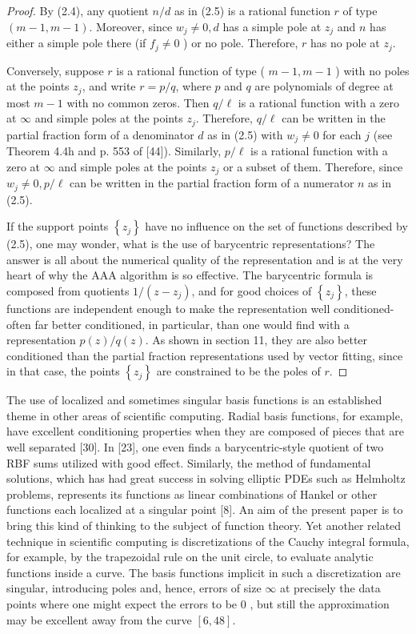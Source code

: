 \documentclass[11pt]{article}
\theoremstyle{definition}
\begin{document}
    
    \begin{proof}
        By (2.4), any quotient $n / d$ as in (2.5) is a rational function $r$ of type $(m-1, m-1)$. Moreover, since $w_{j} \neq 0, d$ has a simple pole at $z_{j}$ and $n$ has either a simple pole there (if $f_{j} \neq 0$ ) or no pole. Therefore, $r$ has no pole at $z_{j}$.
        
        Conversely, suppose $r$ is a rational function of type ( $m-1, m-1$ ) with no poles at the points $z_{j}$, and write $r=p / q$, where $p$ and $q$ are polynomials of degree at most $m-1$ with no common zeros. Then $q / \ell$ is a rational function with a zero at $\infty$ and simple poles at the points $z_{j}$. Therefore, $q / \ell$ can be written in the partial fraction form of a denominator $d$ as in (2.5) with $w_{j} \neq 0$ for each $j$ (see Theorem 4.4h and p. 553 of [44]). Similarly, $p / \ell$ is a rational function with a zero at $\infty$ and simple poles at the points $z_{j}$ or a subset of them. Therefore, since $w_{j} \neq 0, p / \ell$ can be written in the partial fraction form of a numerator $n$ as in (2.5).
        
        If the support points $\left\{z_{j}\right\}$ have no influence on the set of functions described by (2.5), one may wonder, what is the use of barycentric representations? The answer is all about the numerical quality of the representation and is at the very heart of why the AAA algorithm is so effective. The barycentric formula is composed from quotients $1 /\left(z-z_{j}\right)$, and for good choices of $\left\{z_{j}\right\}$, these functions are independent enough to make the representation well conditioned-often far better conditioned, in particular, than one would find with a representation $p(z) / q(z)$. As shown in section 11, they are also better conditioned than the partial fraction representations used by vector fitting, since in that case, the points $\left\{z_{j}\right\}$ are constrained to be the poles of $r$.
    \end{proof}
    
    The use of localized and sometimes singular basis functions is an established theme in other areas of scientific computing. Radial basis functions, for example, have excellent conditioning properties when they are composed of pieces that are well separated [30]. In [23], one even finds a barycentric-style quotient of two RBF sums utilized with good effect. Similarly, the method of fundamental solutions, which has had great success in solving elliptic PDEs such as Helmholtz problems, represents its functions as linear combinations of Hankel or other functions each localized at a singular point [8]. An aim of the present paper is to bring this kind of thinking to the subject of function theory. Yet another related technique in scientific computing is discretizations of the Cauchy integral formula, for example, by the trapezoidal rule on the unit circle, to evaluate analytic functions inside a curve. The basis functions implicit in such a discretization are singular, introducing poles and, hence, errors of size $\infty$ at precisely the data points where one might expect the errors to be 0 , but still the approximation may be excellent away from the curve $[6,48]$.\\
\end{document}
